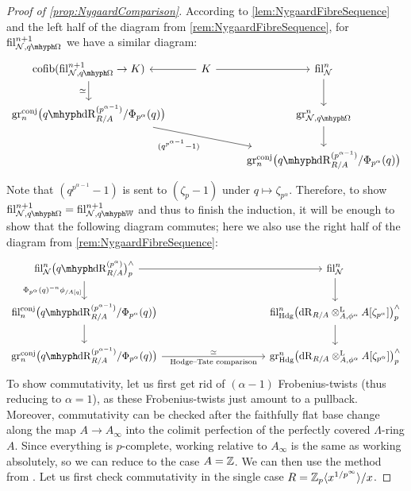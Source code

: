 \documentclass[DIV=12,numbers=enddot,leqno,bibliography=totoc]{scrartcl}
\begin{document}
\begin{proof}[Proof of \cref{prop:NygaardComparison}]
		According to \cref{lem:NygaardFibreSequence} and the left half of the diagram from \cref{rem:NygaardFibreSequence}, for $ \fil_{\Nn,  \qOmega}^{n+1}$ we have a similar diagram:
		\begin{equation*}
			\begin{tikzcd}
				\cofib( \fil_{\Nn, \qOmega}^{n+1}\rightarrow K)\dar["\simeq"'] & K\lar\rar &  \fil_\Nn^n\dar\\
				\gr_n^\mathrm{conj}\bigl(\qdeRham_{R/A}^{(p^{\alpha-1})}/\Phi_{p^\alpha}(q)\bigr)\ar[drr,"(q^{p^{\alpha-1}}-1)"'] & & \gr_{\Nn, \qOmega}^n\dar\\
				& & \gr_n^\mathrm{conj}\bigl(\qdeRham_{R/A}^{(p^{\alpha-1})}/\Phi_{p^\alpha}(q)\bigr)
			\end{tikzcd}
		\end{equation*}
		Note that $(q^{p^{\alpha-1}}-1)$ is sent to $(\zeta_p-1)$ under $q\mapsto \zeta_{p^\alpha}$. Therefore, to show $ \fil_{\Nn,  \qOmega}^{n+1}= \fil_{\Nn, \qIW}^{n+1}$ and thus to finish the induction, it will be enough to show that the following diagram commutes; here we also use the right half of the diagram from \cref{rem:NygaardFibreSequence}:
		\begin{equation*}
			\begin{tikzcd}[column sep=10em]
				\fil_\Nn^n\bigl(\qdeRham_{R/A}^{(p^\alpha)}\bigr)_p^\complete\rar\dar["\Phi_{p^\alpha}(q)^{-n}\phi_{/A[q]}"'] &  \fil_\Nn^n\dar\\
				\fil_n^\mathrm{conj}\bigl(\qdeRham_{R/A}^{(p^{\alpha-1})}/\Phi_{p^\alpha}(q)\bigr)\dar &  \fil_{\Hodge}^n\bigl(\deRham_{R/A}\lotimes_{A,\phi^\alpha}A[\zeta_{p^\alpha}]\bigr)_p^\complete\dar\\
				\gr_n^\mathrm{conj}\bigl(\qdeRham_{R/A}^{(p^{\alpha-1})}/\Phi_{p^\alpha}(q)\bigr)\rar["\simeq","\text{Hodge--Tate comparison}"'] & \gr_{\Hodge}^n\bigl(\deRham_{R/A}\lotimes_{A,\phi^\alpha}A[\zeta_{p^\alpha}]\bigr)_p^\complete
			\end{tikzcd}
		\end{equation*}
		To show commutativity, let us first get rid of $(\alpha-1)$ Frobenius-twists (thus reducing to $\alpha=1$), as these Frobenius-twists just amount to a pullback. Moreover, commutativity can be checked after the faithfully flat base change along the map $A\rightarrow A_\infty$ into the colimit perfection of the perfectly covered $\Lambda$-ring $A$. Since everything is $p$-complete, working relative to $A_\infty$ is the same as working absolutely, so we can reduce to the case $A=\mathbb{Z}$. We can then use the method from \cite[\S{}]{Prismatic}. Let us first check commutativity in the single case $R=\mathbb{Z}_p\langle x^{1/p^\infty}\rangle/x$.
		

\end{proof}
\end{document}
